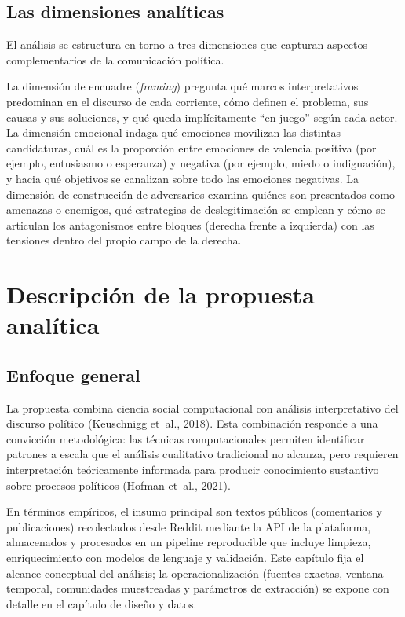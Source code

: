 \documentclass[
  letterpaper,
  numbers=noendperiod,
  fontsize=11pt,
  DIV=12,
  titlepage=false]{scrreprt}
\begin{document}
\subsection{Las dimensiones
analíticas}\label{las-dimensiones-analuxedticas}

El análisis se estructura en torno a tres dimensiones que capturan
aspectos complementarios de la comunicación política.

La dimensión de encuadre (\emph{framing}) pregunta qué marcos
interpretativos predominan en el discurso de cada corriente, cómo
definen el problema, sus causas y sus soluciones, y qué queda
implícitamente ``en juego'' según cada actor. La dimensión emocional
indaga qué emociones movilizan las distintas candidaturas, cuál es la
proporción entre emociones de valencia positiva (por ejemplo, entusiasmo
o esperanza) y negativa (por ejemplo, miedo o indignación), y hacia qué
objetivos se canalizan sobre todo las emociones negativas. La dimensión
de construcción de adversarios examina quiénes son presentados como
amenazas o enemigos, qué estrategias de deslegitimación se emplean y
cómo se articulan los antagonismos entre bloques (derecha frente a
izquierda) con las tensiones dentro del propio campo de la derecha.

\section{Descripción de la propuesta
analítica}\label{descripciuxf3n-de-la-propuesta-analuxedtica}

\subsection{Enfoque general}\label{enfoque-general}

La propuesta combina ciencia social computacional con análisis
interpretativo del discurso político (Keuschnigg et~al., 2018). Esta
combinación responde a una convicción metodológica: las técnicas
computacionales permiten identificar patrones a escala que el análisis
cualitativo tradicional no alcanza, pero requieren interpretación
teóricamente informada para producir conocimiento sustantivo sobre
procesos políticos (Hofman et~al., 2021).

En términos empíricos, el insumo principal son textos públicos
(comentarios y publicaciones) recolectados desde Reddit mediante la API
de la plataforma, almacenados y procesados en un pipeline reproducible
que incluye limpieza, enriquecimiento con modelos de lenguaje y
validación. Este capítulo fija el alcance conceptual del análisis; la
operacionalización (fuentes exactas, ventana temporal, comunidades
muestreadas y parámetros de extracción) se expone con detalle en el
capítulo de diseño y datos.
\end{document}
